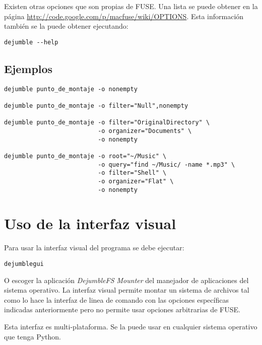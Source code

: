 Existen otras opciones que son propias de FUSE. Una lista se puede obtener en la página \url{http://code.google.com/p/macfuse/wiki/OPTIONS}. Esta información también se la puede obtener ejecutando:

\begin{verbatim}
dejumble --help
\end{verbatim}

\subsection{Ejemplos}

\begin{verbatim}
dejumble punto_de_montaje -o nonempty

dejumble punto_de_montaje -o filter="Null",nonempty

dejumble punto_de_montaje -o filter="OriginalDirectory" \
                          -o organizer="Documents" \
                          -o nonempty

dejumble punto_de_montaje -o root="~/Music" \
                          -o query="find ~/Music/ -name *.mp3" \
                          -o filter="Shell" \
                          -o organizer="Flat" \
                          -o nonempty
\end{verbatim}


\section{Uso de la interfaz visual}

Para usar la interfaz visual del programa se debe ejecutar:

\begin{verbatim}
dejumblegui
\end{verbatim}

O escoger la aplicación \textit{DejumbleFS Mounter} del manejador de aplicaciones del sistema operativo. La interfaz visual permite montar un sistema de archivos tal como lo hace la interfaz de linea de comando con las opciones específicas indicadas anteriormente pero no permite usar opciones arbitrarias de FUSE.


Esta interfaz es multi-plataforma. Se la puede usar en cualquier sistema operativo que tenga Python.



